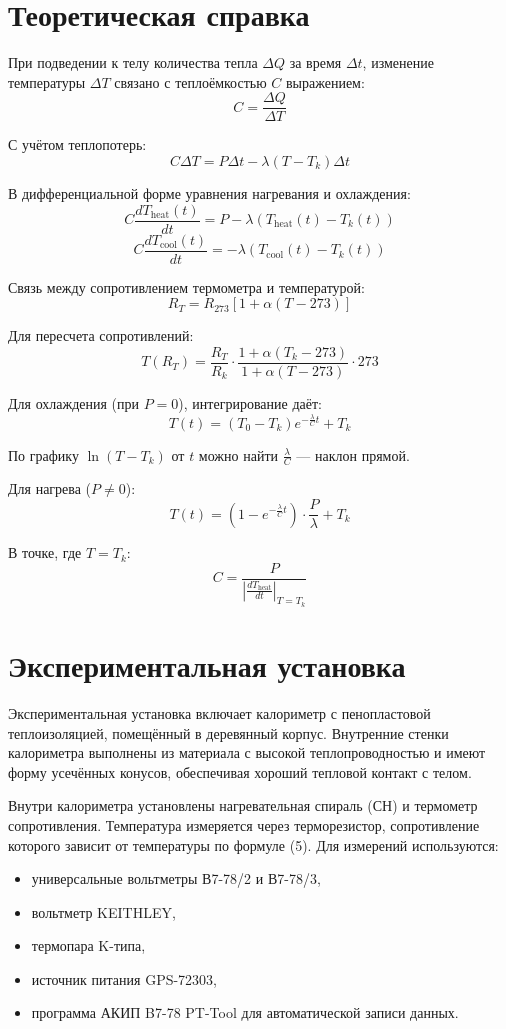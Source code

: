 \documentclass[a4paper,12pt]{article} %
\begin{document}
\section*{Теоретическая справка}

При подведении к телу количества тепла $\Delta Q$ за время $\Delta t$, изменение температуры $\Delta T$ связано с теплоёмкостью $C$ выражением:
\[
C = \frac{\Delta Q}{\Delta T}
\]

С учётом теплопотерь:
\[
C \Delta T = P \Delta t - \lambda (T - T_k) \Delta t \tag{2}
\]

В дифференциальной форме уравнения нагревания и охлаждения:
\[
C \frac{dT_{\text{heat}}(t)}{dt} = P - \lambda (T_{\text{heat}}(t) - T_k(t)) \tag{3}
\]
\[
C \frac{dT_{\text{cool}}(t)}{dt} = -\lambda (T_{\text{cool}}(t) - T_k(t)) \tag{4}
\]

Связь между сопротивлением термометра и температурой:
\[
R_T = R_{273} \left[ 1 + \alpha (T - 273) \right] \tag{5}
\]

Для пересчета сопротивлений:
\[
T(R_T) = \frac{R_T}{R_k} \cdot \frac{1 + \alpha (T_k - 273)}{1 + \alpha (T - 273)} \cdot 273 \tag{7}
\]

Для охлаждения (при $P=0$), интегрирование даёт:
\[
T(t) = (T_0 - T_k) e^{-\frac{\lambda}{C}t} + T_k \tag{11}
\]

По графику $\ln(T - T_k)$ от $t$ можно найти $\frac{\lambda}{C}$ — наклон прямой.

Для нагрева ($P \neq 0$):
\[
T(t) = \left(1 - e^{-\frac{\lambda}{C}t} \right) \cdot \frac{P}{\lambda} + T_k \tag{15}
\]

В точке, где $T = T_k$:
\[
C = \frac{P}{\left| \frac{dT_{\text{heat}}}{dt} \right|_{T = T_k}} \tag{16}
\]

\section*{Экспериментальная установка}

Экспериментальная установка включает калориметр с пенопластовой теплоизоляцией, помещённый в деревянный корпус. Внутренние стенки калориметра выполнены из материала с высокой теплопроводностью и имеют форму усечённых конусов, обеспечивая хороший тепловой контакт с телом.

Внутри калориметра установлены нагревательная спираль (СН) и термометр сопротивления. Температура измеряется через терморезистор, сопротивление которого зависит от температуры по формуле (5). Для измерений используются: 
\begin{itemize}
	\item универсальные вольтметры В7-78/2 и В7-78/3,
	\item вольтметр KEITHLEY,
	\item термопара K-типа,
	\item источник питания GPS-72303,
	\item программа АКИП B7-78 PT-Tool для автоматической записи данных.
\end{itemize}
\end{document}
